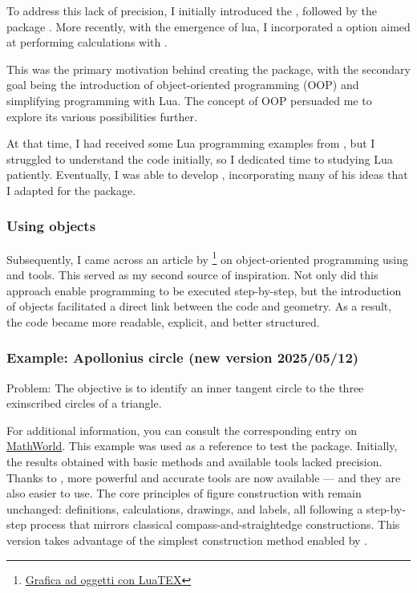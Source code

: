 \vspace{.5em}
To address this lack of precision, I initially introduced the , followed by the package . More recently, with the emergence of lua\LATEX{}, I incorporated a  option aimed at performing calculations with .

This was the primary motivation behind creating the package, with the secondary goal being the introduction of object-oriented programming (OOP) and simplifying programming with Lua. The concept of OOP persuaded me to explore its various possibilities further.

At that time, I had received some Lua programming examples from {}, but I struggled to understand the code initially, so I dedicated time to studying Lua patiently. Eventually, I was able to develop \tkzname{\tkznameofpack}, incorporating many of his ideas that I adapted for the package.


\subsubsection{Using objects} %
\label{ssub:using_objects}

Subsequently, I came across an article by \footnote{\href{https://www.guitex.org/home/images/meeting2012/slides/presentazione_giacomell_guitmeeting_2012.pdf}{Grafica ad oggetti con LuaTEX}}  on object-oriented programming using  and \tkzNamePack{\TIKZ} tools. This served as my second source of inspiration.   Not only did this approach enable programming to be executed step-by-step, but the introduction of objects facilitated a direct link between the code and geometry. As a result, the code became more readable, explicit, and better structured.

\subsubsection{Example: Apollonius circle (new version 2025/05/12)} %
\label{ssub:example_apollonius_circle}

\begin{mybox}{Problem:}
The objective is to identify an inner tangent circle to the three exinscribed circles of a triangle.\end{mybox}


For additional information, you can consult the corresponding entry on \href{https://mathworld.wolfram.com/ApolloniusCircle.html}{MathWorld}.
This example was used as a reference to test the  package. Initially, the results obtained with basic methods and available tools lacked precision. Thanks to , more powerful and accurate tools are now available — and they are also easier to use.
The core principles of figure construction with  remain unchanged: definitions, calculations, drawings, and labels, all following a step-by-step process that mirrors classical compass-and-straightedge constructions.
This version takes advantage of the simplest construction method enabled by .


